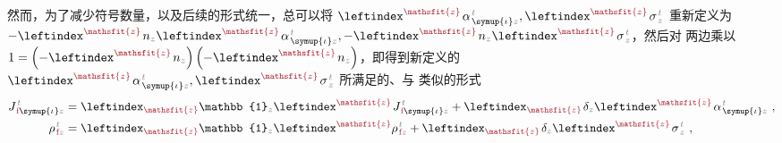 然而，为了减少符号数量，以及后续的形式统一，总可以将 $\leftindex^{\textcolor{Maroon}{\mathsfit{z}}} \;\!
{\alpha}^{\;\!\mathcolor{gray}{t}}_{\;\! \symup{\iota}\mathcolor{gray}{z}}, \leftindex^{\textcolor{Maroon}{\mathsfit{z}}} \;\! {\sigma}^{\;\!\mathcolor{gray}{t}}_{\;\! \mathcolor{gray}{z}}$ 重新定义为 $-\leftindex^{\textcolor{Maroon}{\mathsfit{z}}} \;\! n_{\mathcolor{gray}{z}} \leftindex^{\textcolor{Maroon}{\mathsfit{z}}} \;\!
{\alpha}^{\;\!\mathcolor{gray}{t}}_{\;\! \symup{\iota}\mathcolor{gray}{z}}, -\leftindex^{\textcolor{Maroon}{\mathsfit{z}}} \;\! n_{\mathcolor{gray}{z}} \leftindex^{\textcolor{Maroon}{\mathsfit{z}}} \;\! {\sigma}^{\;\!\mathcolor{gray}{t}}_{\;\! \mathcolor{gray}{z}}$，然后对  两边乘以 $1 = \left( - \leftindex^{\textcolor{Maroon}{\mathsfit{z}}} \;\! n_{\mathcolor{gray}{z}} \right) \left( - \leftindex^{\textcolor{Maroon}{\mathsfit{z}}} \;\! n_{\mathcolor{gray}{z}} \right)$，即得到新定义的 $\leftindex^{\textcolor{Maroon}{\mathsfit{z}}} \;\!
{\alpha}^{\;\!\mathcolor{gray}{t}}_{\;\! \symup{\iota}\mathcolor{gray}{z}}, \leftindex^{\textcolor{Maroon}{\mathsfit{z}}} \;\! {\sigma}^{\;\!\mathcolor{gray}{t}}_{\;\! \mathcolor{gray}{z}}$ 所满足的、与  类似的形式
\begin{subequations} \label{eq:e-f-01'}
	\abovedisplayskip=5pt
\begin{align}
	J^{\;\!\mathcolor{gray}{t}}_{\;\!\textcolor{Maroon}{\text{f}} \symup{\iota}\mathcolor{gray}{z}} &= \leftindex_{\textcolor{Maroon}{\mathsfit{z}}} {\mathbb{1}}_{\mathcolor{gray}{z}} \leftindex^{\textcolor{Maroon}{\mathsfit{z}}} \;\! J^{\;\!\mathcolor{gray}{t}}_{\;\!\textcolor{Maroon}{\text{f}} \symup{\iota}\mathcolor{gray}{z}} + \leftindex_{\textcolor{Maroon}{\mathsfit{z}}} \;\! \delta_{\mathcolor{gray}{z}} \leftindex^{\textcolor{Maroon}{\mathsfit{z}}} \;\!
	{\alpha}^{\;\!\mathcolor{gray}{t}}_{\;\! \symup{\iota}\mathcolor{gray}{z}} ~, \label{eq:j-f-01'} \\
	{\rho}^{\;\!\mathcolor{gray}{t}}_{\;\!\textcolor{Maroon}{\text{f}} \mathcolor{gray}{z}} &= \leftindex_{\textcolor{Maroon}{\mathsfit{z}}} {\mathbb{1}}_{\mathcolor{gray}{z}} \leftindex^{\textcolor{Maroon}{\mathsfit{z}}} {\rho}^{\;\!\mathcolor{gray}{t}}_{\;\!\textcolor{Maroon}{\text{f}} \mathcolor{gray}{z}} + \leftindex_{\textcolor{Maroon}{\mathsfit{z}}} \;\! \delta_{\mathcolor{gray}{z}} \leftindex^{\textcolor{Maroon}{\mathsfit{z}}} \;\! {\sigma}^{\;\!\mathcolor{gray}{t}}_{\;\! \mathcolor{gray}{z}} ~, \label{eq:p-f-01'}
\end{align}
\end{subequations}
